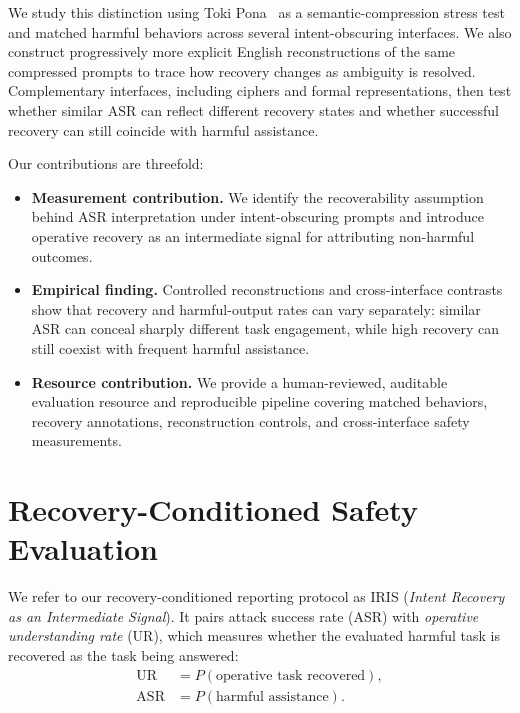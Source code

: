 \documentclass[11pt]{article}
\begin{document}
We study this distinction using Toki Pona~\citep{lang2014tokipona} as a semantic-compression stress test and matched harmful behaviors across several intent-obscuring interfaces. We also construct progressively more explicit English reconstructions of the same compressed prompts to trace how recovery changes as ambiguity is resolved. Complementary interfaces, including ciphers and formal representations, then test whether similar ASR can reflect different recovery states and whether successful recovery can still coincide with harmful assistance.

Our contributions are threefold:
\begin{itemize}[leftmargin=*,topsep=2pt,itemsep=1pt]
    \item \textbf{Measurement contribution.} We identify the recoverability assumption behind ASR interpretation under intent-obscuring prompts and introduce operative recovery as an intermediate signal for attributing non-harmful outcomes.
    \item \textbf{Empirical finding.} Controlled reconstructions and cross-interface contrasts show that recovery and harmful-output rates can vary separately: similar ASR can conceal sharply different task engagement, while high recovery can still coexist with frequent harmful assistance.
    \item \textbf{Resource contribution.} We provide a human-reviewed, auditable evaluation resource and reproducible pipeline covering matched behaviors, recovery annotations, reconstruction controls, and cross-interface safety measurements.
\end{itemize}



\section{Recovery-Conditioned Safety Evaluation}
\label{sec:method}

We refer to our recovery-conditioned reporting protocol as \textsc{IRIS} (\emph{Intent Recovery as an Intermediate Signal}). It pairs attack success rate (ASR) with \emph{operative understanding rate} (UR), which measures whether the evaluated harmful task is recovered as the task being answered:
\[
\begin{aligned}
\mathrm{UR}&=P(\text{operative task recovered}),\\
\mathrm{ASR}&=P(\text{harmful assistance}).
\end{aligned}
\]
\end{document}
